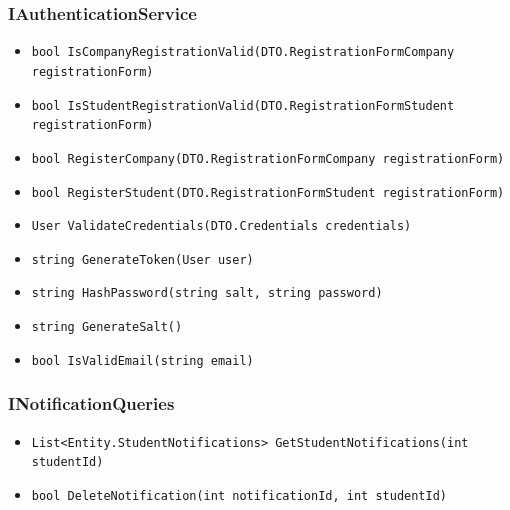 \subsubsection{IAuthenticationService}
\begin{itemize}
    \item \verb|bool IsCompanyRegistrationValid(DTO.RegistrationFormCompany registrationForm)|
    \item \verb|bool IsStudentRegistrationValid(DTO.RegistrationFormStudent registrationForm)|
    \item \verb|bool RegisterCompany(DTO.RegistrationFormCompany registrationForm)|
    \item \verb|bool RegisterStudent(DTO.RegistrationFormStudent registrationForm)|
    \item \verb|User ValidateCredentials(DTO.Credentials credentials)|
    \item \verb|string GenerateToken(User user)|
    \item \verb|string HashPassword(string salt, string password)|
    \item \verb|string GenerateSalt()|
    \item \verb|bool IsValidEmail(string email)|
\end{itemize}

\subsubsection{INotificationQueries}
\begin{itemize}
    \item \verb|List<Entity.StudentNotifications> GetStudentNotifications(int studentId)|
    \item \verb|bool DeleteNotification(int notificationId, int studentId)|
\end{itemize}

